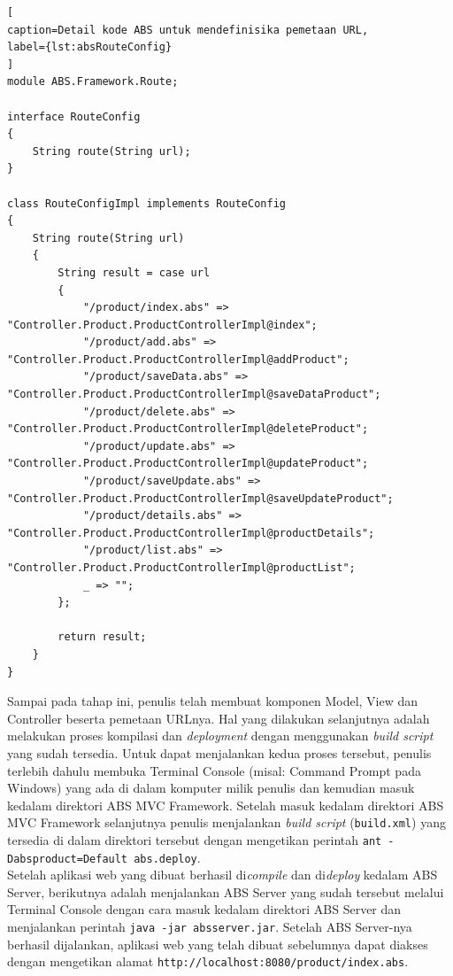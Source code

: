 \begin{lstlisting}[
caption=Detail kode ABS untuk mendefinisika pemetaan URL,
label={lst:absRouteConfig}
]
module ABS.Framework.Route;

interface RouteConfig
{
	String route(String url);
}

class RouteConfigImpl implements RouteConfig
{
	String route(String url)
	{
		String result = case url
		{
			"/product/index.abs" => "Controller.Product.ProductControllerImpl@index";
			"/product/add.abs" => "Controller.Product.ProductControllerImpl@addProduct";
			"/product/saveData.abs" => "Controller.Product.ProductControllerImpl@saveDataProduct";
			"/product/delete.abs" => "Controller.Product.ProductControllerImpl@deleteProduct";
			"/product/update.abs" => "Controller.Product.ProductControllerImpl@updateProduct";
			"/product/saveUpdate.abs" => "Controller.Product.ProductControllerImpl@saveUpdateProduct";
			"/product/details.abs" => "Controller.Product.ProductControllerImpl@productDetails";
			"/product/list.abs" => "Controller.Product.ProductControllerImpl@productList";
			_ => "";
		};
		
		return result;
	}
}
\end{lstlisting}

Sampai pada tahap ini, penulis telah membuat komponen Model, View dan Controller beserta pemetaan URLnya. Hal yang dilakukan selanjutnya adalah melakukan proses kompilasi dan \textit{deployment} dengan menggunakan \textit{build script} yang sudah tersedia. Untuk dapat menjalankan kedua proses tersebut, penulis terlebih dahulu membuka Terminal Console (misal: Command Prompt pada Windows) yang ada di dalam komputer milik penulis dan kemudian masuk kedalam direktori ABS MVC Framework. Setelah masuk kedalam direktori ABS MVC Framework selanjutnya penulis menjalankan \textit{build script} (\texttt{build.xml}) yang tersedia di dalam direktori tersebut dengan mengetikan perintah \texttt{ant -Dabsproduct=Default abs.deploy}.\\

Setelah aplikasi web yang dibuat berhasil di\textit{compile} dan di\textit{deploy} kedalam ABS Server, berikutnya adalah menjalankan ABS Server yang sudah tersebut melalui Terminal Console dengan cara masuk kedalam direktori ABS Server dan menjalankan perintah \texttt{java -jar absserver.jar}. Setelah ABS Server-nya berhasil dijalankan, aplikasi web yang telah dibuat sebelumnya dapat diakses dengan mengetikan alamat \texttt{http://localhost:8080/product/index.abs}.


